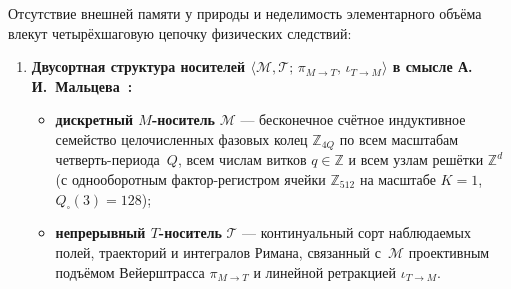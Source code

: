 \documentclass[11pt,a4paper]{article}
\theoremstyle{plain}
\theoremstyle{definition}
\begin{document}
Отсутствие внешней памяти у природы и неделимость элементарного объёма влекут четырёхшаговую цепочку физических следствий:
\begin{enumerate}[label=\textbf{Шаг \arabic*.},leftmargin=*]
\item \textbf{Двусортная структура носителей $\langle\mathcal{M},\mathcal{T};\,\pi_{M\to T},\,\iota_{T\to M}\rangle$ в смысле А.\,И.~Мальцева~\cite{Malcev1970}:}
  \begin{itemize}[leftmargin=*]
  \item \textbf{дискретный $M$-носитель} $\mathcal{M}$ --- бесконечное счётное индуктивное семейство целочисленных фазовых колец $\mathbb{Z}_{4Q}$ по всем масштабам четверть-периода~$Q$, всем числам витков $q\in\mathbb{Z}$ и всем узлам решётки $\mathbb{Z}^d$ (с однооборотным фактор-регистром ячейки $\mathbb{Z}_{512}$ на масштабе $K=1$, $Q_\square(3)=128$);
  \item \textbf{непрерывный $T$-носитель} $\mathcal{T}$ --- континуальный сорт наблюдаемых полей, траекторий и интегралов Римана, связанный с~$\mathcal{M}$ проективным подъёмом Вейерштрасса $\pi_{M\to T}$ и линейной ретракцией $\iota_{T\to M}$.
  \end{itemize}


\end{enumerate}
\end{document}
